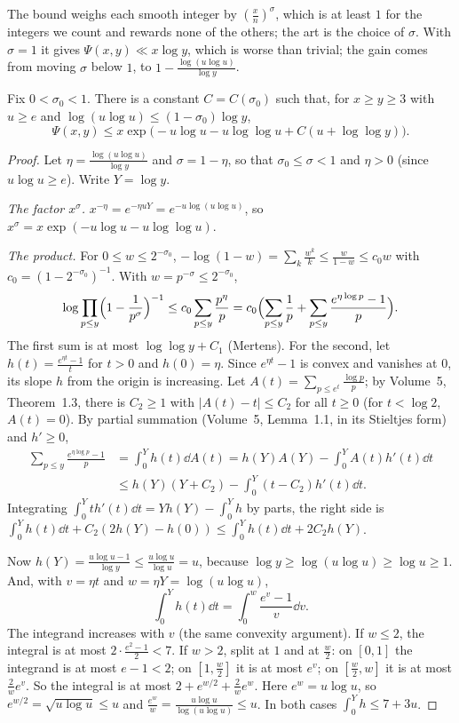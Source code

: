 The bound weighs each smooth integer by $(\frac xn)^\sigma$, which is at least $1$ for the integers we count and rewards none of the others; the art is the choice of $\sigma$. With $\sigma=1$ it gives $\Psi(x,y)\ll x\log y$, which is worse than trivial; the gain comes from moving $\sigma$ below $1$, to $1-\frac{\log(u\log u)}{\log y}$.

\begin{theorem}\label{thm:rankin}
Fix $0<\sigma_0<1$. There is a constant $C=C(\sigma_0)$ such that, for $x\ge y\ge3$ with $u\ge e$ and $\log(u\log u)\le(1-\sigma_0)\log y$,
\[
\Psi(x,y)\le x\exp\bigl(-u\log u-u\log\log u+C(u+\log\log y)\bigr).
\]
\end{theorem}
\begin{proof}
Let $\eta=\frac{\log(u\log u)}{\log y}$ and $\sigma=1-\eta$, so that $\sigma_0\le\sigma<1$ and $\eta>0$ (since $u\log u\ge e$). Write $Y=\log y$.

\emph{The factor $x^\sigma$.} $x^{-\eta}=e^{-\eta uY}=e^{-u\log(u\log u)}$, so $x^\sigma=x\exp(-u\log u-u\log\log u)$.

\emph{The product.} For $0\le w\le2^{-\sigma_0}$, $-\log(1-w)=\sum_k\frac{w^k}k\le\frac w{1-w}\le c_0w$ with $c_0=(1-2^{-\sigma_0})^{-1}$. With $w=p^{-\sigma}\le2^{-\sigma_0}$,
\[
\log\prod_{p\le y}\Bigl(1-\frac1{p^\sigma}\Bigr)^{-1}\le c_0\sum_{p\le y}\frac{p^\eta}p=c_0\Bigl(\sum_{p\le y}\frac1p+\sum_{p\le y}\frac{e^{\eta\log p}-1}p\Bigr).
\]
The first sum is at most $\log\log y+C_1$ (Mertens). For the second, let $h(t)=\frac{e^{\eta t}-1}t$ for $t>0$ and $h(0)=\eta$. Since $e^{\eta t}-1$ is convex and vanishes at $0$, its slope $h$ from the origin is increasing. Let $A(t)=\sum_{p\le e^t}\frac{\log p}p$; by Volume~5, Theorem~1.3, there is $C_2\ge1$ with $|A(t)-t|\le C_2$ for all $t\ge0$ (for $t<\log2$, $A(t)=0$). By partial summation (Volume~5, Lemma~1.1, in its Stieltjes form) and $h'\ge0$,
\[
\begin{aligned}\sum_{p\le y}\frac{e^{\eta\log p}-1}p&=\int_0^Yh(t)\dd A(t)=h(Y)A(Y)-\int_0^YA(t)h'(t)\dd t\\&\le h(Y)(Y+C_2)-\int_0^Y(t-C_2)h'(t)\dd t.\end{aligned}
\]
Integrating $\int_0^Yth'(t)\dd t=Yh(Y)-\int_0^Yh$ by parts, the right side is $\int_0^Yh(t)\dd t+C_2(2h(Y)-h(0))\le\int_0^Yh(t)\dd t+2C_2h(Y)$.

Now $h(Y)=\frac{u\log u-1}{\log y}\le\frac{u\log u}{\log u}=u$, because $\log y\ge\log(u\log u)\ge\log u\ge1$. And, with $v=\eta t$ and $w=\eta Y=\log(u\log u)$,
\[
\int_0^Yh(t)\dd t=\int_0^w\frac{e^v-1}v\dd v.
\]
The integrand increases with $v$ (the same convexity argument). If $w\le2$, the integral is at most $2\cdot\frac{e^2-1}2<7$. If $w>2$, split at $1$ and at $\frac w2$: on $[0,1]$ the integrand is at most $e-1<2$; on $[1,\frac w2]$ it is at most $e^v$; on $[\frac w2,w]$ it is at most $\frac2we^v$. So the integral is at most $2+e^{w/2}+\frac2we^w$. Here $e^w=u\log u$, so $e^{w/2}=\sqrt{u\log u}\le u$ and $\frac{e^w}w=\frac{u\log u}{\log(u\log u)}\le u$. In both cases $\int_0^Yh\le7+3u$.


\end{proof}
